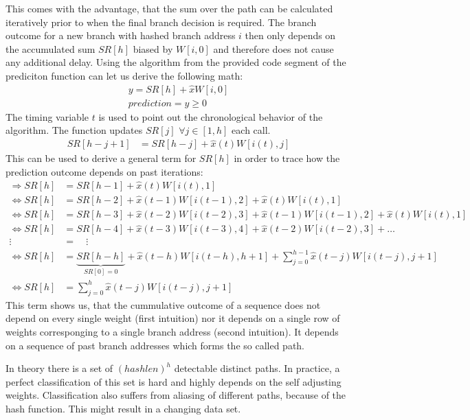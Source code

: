\documentclass{article}
\begin{document}
This comes with the advantage, that the sum over the path can be calculated iteratively prior to when the final branch decision is required. The branch outcome for a new branch with hashed branch address $i$ then only depends on the accumulated sum $SR[h]$ biased by $W[i,0]$ and therefore does not cause any additional delay. 
Using the algorithm from the provided code segment of the prediciton function can let us derive the following math:
\begin{align*}
	y = SR[h] + \hat{x} W[i,0] \\
	\textit{prediction} = y\geq 0
\end{align*}
The timing variable $t$ is used to point out the chronological behavior of the algorithm. The function updates $SR[j]$ $\forall j \in [1,h]$ each call.
\begin{align*}
	SR[h-j+1] &= SR[h-j] + \hat{x}(t) W[i(t),j] 
\end{align*}
This can be used to derive a general term for $SR[h]$ in order to trace how the prediction outcome depends on past iterations:
\begin{align*}
	\Rightarrow SR[h] &= SR[h-1] + \hat{x}(t) W[i(t),1] \\
	\iff SR[h] &= SR[h-2] + \hat{x}(t-1) W[i(t-1),2] + \hat{x}(t) W[i(t),1] \\
	\iff SR[h] &= SR[h-3] + \hat{x}(t-2) W[i(t-2),3] + \hat{x}(t-1) W[i(t-1),2] + \hat{x}(t) W[i(t),1] \\
	\iff SR[h] &= SR[h-4] + \hat{x}(t-3) W[i(t-3),4] + \hat{x}(t-2) W[i(t-2),3] + \dots \\%
	\vdots \quad &= \quad \vdots \\
	\iff SR[h] &= \underbrace{SR[h-h]}_{SR[0] = 0} + \hat{x}(t-h) W[i(t-h),h+1] + \sum_{j=0}^{h-1} \hat{x}(t-j) W[i(t-j),j+1] \\
	\iff SR[h] &=\sum_{j=0}^{h} \hat{x}(t-j) W[i(t-j),j+1] 
\end{align*}
This term shows us, that the cummulative outcome of a sequence does not depend on every single weight (first intuition) nor it depends on a single row of weights corresponging to a single branch address (second intuition). It depends on a sequence of past branch addresses which forms the so called path.

In theory there is a set of ${(hashlen)}^{h}$ detectable distinct paths. In practice, a perfect classification of this set is hard and highly depends on the self adjusting weights. Classification also suffers from aliasing of different paths, because of the hash function. This might result in a changing data set. 
\end{document}
